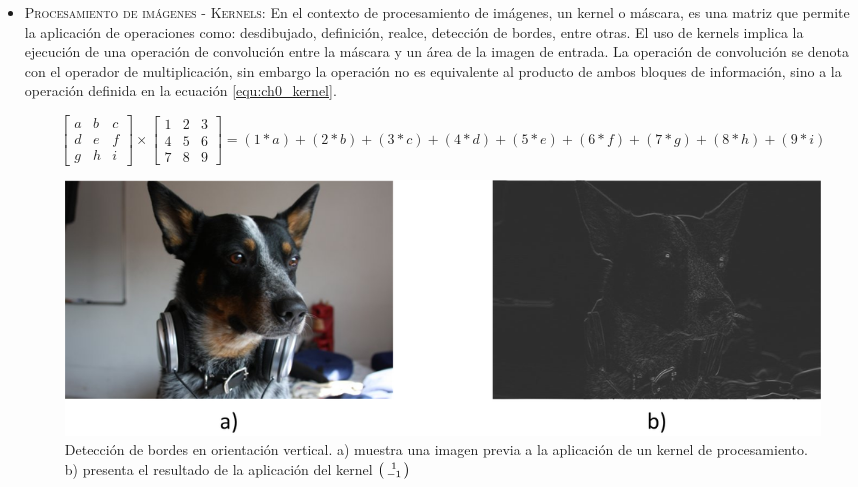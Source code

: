 \begin{itemize}
			\item 	\textsc{Procesamiento de imágenes - Kernels}: En el contexto de procesamiento de imágenes, un kernel o máscara, es una matriz que permite la aplicación de operaciones como: desdibujado, definición, realce, detección de bordes, entre otras. El uso de kernels implica la ejecución de una operación de convolución entre la máscara y un área de la imagen de entrada. La operación de convolución se denota con el operador de multiplicación, sin embargo la operación no es equivalente  al producto de ambos bloques de información, sino a la operación definida en la ecuación \ref{equ:ch0_kernel}.

			\begin{equation}
				\begin{bmatrix}
						a & b & c\\
						d & e & f\\
						g & h & i
				\end{bmatrix}
						\times
				\begin{bmatrix}
						1 & 2 & 3\\
						4 & 5 & 6\\
						7 & 8 & 9
				\end{bmatrix}
				= (1*a) + (2*b) + (3*c) + (4*d) + (5*e) +
				(6*f) + (7*g) + (8*h) + (9*i)
				\label{equ:ch0_kernel}
			\end{equation}

			\begin{figure}
				\captionsetup{singlelinecheck=off}
				\begin{center}
						\includegraphics[scale = 0.9]{figures/ch0_kernel_border.png}
				\end{center}
					\caption
						{	
							Detección de bordes en orientación vertical. a) muestra una imagen previa a la aplicación de un kernel de procesamiento. b) presenta el resultado de la aplicación del kernel $\left(\protect\begin{smallmatrix}1\\-1\protect\end{smallmatrix}\right)$
						}
					\label{fig:ch0_kernel_border}
				\end{figure}



\end{itemize}
